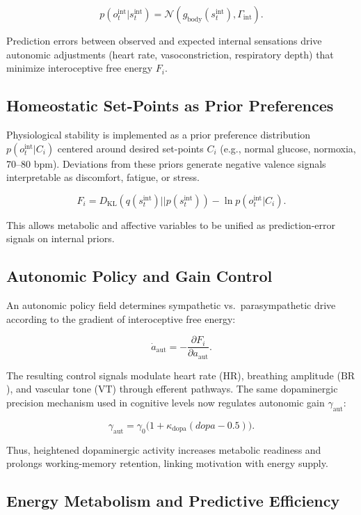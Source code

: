 \documentclass[9pt]{elife}
\begin{document}
\[
p(o_t^{\mathrm{int}}|s_t^{\mathrm{int}}) = \mathcal{N}( g_{\mathrm{body}}(s_t^{\mathrm{int}}), \Gamma_{\mathrm{int}} ).
\]

Prediction errors between observed and expected internal sensations drive
autonomic adjustments (heart rate, vasoconstriction, respiratory depth)
that minimize interoceptive free energy $F_i$.

\subsection{Homeostatic Set-Points as Prior Preferences}

Physiological stability is implemented as a prior preference distribution
$p(o_t^{\mathrm{int}}|C_i)$ centered around desired set-points $C_i$
(e.g., normal glucose, normoxia, 70–80 bpm).
Deviations from these priors generate negative valence signals
interpretable as discomfort, fatigue, or stress.

\begin{equation}
F_i = D_{\mathrm{KL}}(q(s_t^{\mathrm{int}})||p(s_t^{\mathrm{int}}))
     - \ln p(o_t^{\mathrm{int}}|C_i).
\end{equation}

This allows metabolic and affective variables to be unified as
prediction-error signals on internal priors.

\subsection{Autonomic Policy and Gain Control}

An autonomic policy field determines sympathetic vs.~parasympathetic
drive according to the gradient of interoceptive free energy:

\[
\dot{a}_{\mathrm{aut}} = -\frac{\partial F_i}{\partial a_{\mathrm{aut}}}.
\]

The resulting control signals modulate heart rate ($\mathrm{HR}$),
breathing amplitude ($\mathrm{BR}$), and vascular tone ($\mathrm{VT}$)
through efferent pathways.
The same dopaminergic precision mechanism used in cognitive levels
now regulates autonomic gain $\gamma_{\mathrm{aut}}$:

\[
\gamma_{\mathrm{aut}} = \gamma_0 \big( 1 + \kappa_{\mathrm{dopa}} (dopa - 0.5) \big).
\]

Thus, heightened dopaminergic activity increases metabolic readiness
and prolongs working-memory retention, linking motivation with energy supply.

\subsection{Energy Metabolism and Predictive Efficiency}
\end{document}
